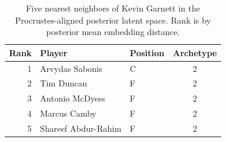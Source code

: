 \begin{table}[htbp]
  \centering\small
  \begin{tabular}{rllc}
    \toprule
    Rank & Player & Position & Archetype \\
    \midrule
    1 & Arvydas Sabonis & C & 2 \\
    2 & Tim Duncan & F & 2 \\
    3 & Antonio McDyess & F & 2 \\
    4 & Marcus Camby & F & 2 \\
    5 & Shareef Abdur-Rahim & F & 2 \\
    \bottomrule
  \end{tabular}
  \caption{Five nearest neighbors of Kevin Garnett in the Procrustes-aligned posterior latent space. Rank is by posterior mean embedding distance.}
  \label{tab:Kevin_Garnett_neighbors}
\end{table}

